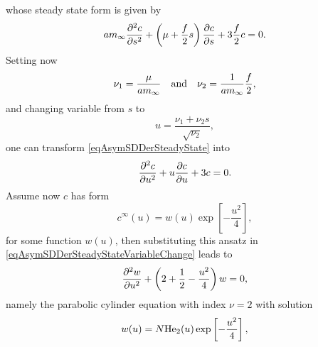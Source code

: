                 whose steady state form is given by
                \begin{equation}
                    am_\infty\frac{\partial^2c}{\partial s^2}
                    +\left(\mu+\frac f2s\right)\frac{\partial c}{\partial s}+3\frac f2c=0.
                    \label{eqAsymSDDerSteadyState}
                \end{equation}
                Setting now
                \begin{equation}
                    \nu_1=\frac\mu{am_\infty}
                    \quad\text{and}\quad
                    \nu_2=\frac1{am_\infty}\frac f2,
                    \label{eqAsymSDDerParameters}
                \end{equation}
                and changing variable \cite[(B13) on p. 3473]{KPGPoschel2003} from $s$ to
                \begin{equation}
                    u=\frac{\nu_1+\nu_2s}{\sqrt{\nu_2}},
                    \label{eqAsymSDDerVariableChange}
                \end{equation}
                one can transform \eqref{eqAsymSDDerSteadyState} into
                \begin{equation}
                    \frac{\partial^2c}{\partial u^2}+u\frac{\partial c}{\partial u}+3c=0.
                    \label{eqAsymSDDerSteadyStateVariableChange}
                \end{equation}
                Assume now $c$ has form
                \begin{equation}
                    c^\infty(u)=w(u)\exp\left[-\frac{u^2}4\right],
                    \label{eqAsymSDDerSolAnsatzChangedVariable}
                \end{equation}
                for some function $w(u)$, then substituting this ansatz in \eqref{eqAsymSDDerSteadyStateVariableChange} leads to \cite[(B15) on p. 3473]{KPGPoschel2003}
                \begin{equation}
                    \frac{\partial^2w}{\partial u^2}+\left(2+\frac12-\frac{u^2}4\right)w=0,
                    \label{eqAsymSDDerWParabolicCylinderEquation}
                \end{equation}
                namely the parabolic cylinder equation with index $\nu=2$ \cite[(3.5.11) at p. 96]{AMMOrszag1978} with solution
                \begin{equation}
                    w(u)=N\mathrm{He}_2(u)\exp\left[-\frac{u^2}4\right],
                    \label{eqAsymSDDerWParabolicCylinderEquationSol}
                \end{equation}
